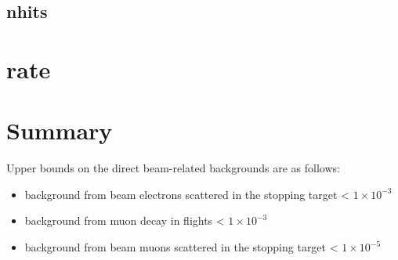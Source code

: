 \documentclass[12pt]{article}
\begin{document}
\subsection{nhits}

\section{rate}









\newpage
\section{Summary}
Upper bounds on the direct beam-related backgrounds are as follows:
\begin{itemize}
\item
  background from beam electrons scattered in the stopping target < $1 \times 10^{-3}$
\item
  background from muon decay in flights < $1 \times 10^{-3}$
\item
  background from beam muons scattered in the stopping target < $1 \times 10^{-5}$
\end{itemize}
%
\newpage


\end{document}
